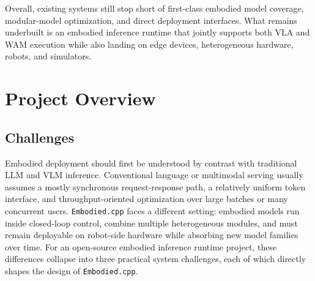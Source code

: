 \documentclass[11pt,letterpaper,logo]{seu-paisys}
\newcommand{\system}{\texttt{Embodied.cpp}\xspace}
\begin{document}

Overall, existing systems still stop short of first-class embodied model coverage, modular-model optimization, and direct deployment interfaces. What remains underbuilt is an embodied inference runtime that jointly supports both VLA and WAM execution while also landing on edge devices, heterogeneous hardware, robots, and simulators.

\section{Project Overview}

\subsection{Challenges}

Embodied deployment should first be understood by contrast with traditional LLM and VLM inference. Conventional language or multimodal serving usually assumes a mostly synchronous request-response path, a relatively uniform token interface, and throughput-oriented optimization over large batches or many concurrent users. \system faces a different setting: embodied models run inside closed-loop control, combine multiple heterogeneous modules, and must remain deployable on robot-side hardware while absorbing new model families over time. For an open-source embodied inference runtime project, these differences collapse into three practical system challenges, each of which directly shapes the design of \system.
\end{document}
